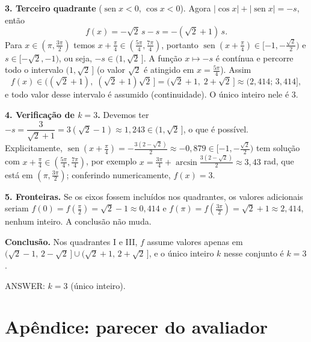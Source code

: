 \documentclass{article}%
\begin{document}
\textbf{3. Terceiro quadrante} ($\operatorname{sen}x<0$, $\cos x<0$). Agora $|\cos x|+|\operatorname{sen} x| = -s$, então
\[
f(x)=-\sqrt2\,s-s=-(\sqrt2+1)\,s .
\]
Para $x\in(\pi,\tfrac{3\pi}{2})$ temos $x+\tfrac{\pi}{4}\in(\tfrac{5\pi}{4},\tfrac{7\pi}{4})$, portanto $\operatorname{sen}(x+\tfrac{\pi}{4})\in[-1,-\tfrac{\sqrt2}{2})$ e $s\in[-\sqrt2,-1)$, ou seja, $-s\in(1,\sqrt2\,]$. A função $x\mapsto -s$ é contínua e percorre todo o intervalo $(1,\sqrt2\,]$ (o valor $\sqrt2$ é atingido em $x=\tfrac{5\pi}{4}$). Assim
\[
f(x)\in\big((\sqrt2+1),\;(\sqrt2+1)\sqrt2\,\big]=\big(\sqrt2+1,\;2+\sqrt2\,\big]\approx(2{,}414;\,3{,}414],
\]
e todo valor desse intervalo é assumido (continuidade). O único inteiro nele é $3$.

\textbf{4. Verificação de $k=3$.} Devemos ter $-s=\dfrac{3}{\sqrt2+1}=3(\sqrt2-1)\approx1{,}243\in(1,\sqrt2\,]$, o que é possível. Explicitamente, $\operatorname{sen}(x+\tfrac{\pi}{4})=-\tfrac{3(2-\sqrt2)}{2}\approx-0{,}879\in[-1,-\tfrac{\sqrt2}{2})$ tem solução com $x+\tfrac{\pi}{4}\in(\tfrac{5\pi}{4},\tfrac{7\pi}{4})$, por exemplo $x=\tfrac{3\pi}{4}+\arcsin\tfrac{3(2-\sqrt2)}{2}\approx3{,}43$ rad, que está em $(\pi,\tfrac{3\pi}{2})$; conferindo numericamente, $f(x)=3$.

\textbf{5. Fronteiras.} Se os eixos fossem incluídos nos quadrantes, os valores adicionais seriam $f(0)=f(\tfrac{\pi}{2})=\sqrt2-1\approx0{,}414$ e $f(\pi)=f(\tfrac{3\pi}{2})=\sqrt2+1\approx2{,}414$, nenhum inteiro. A conclusão não muda.

\textbf{Conclusão.} Nos quadrantes I e III, $f$ assume valores apenas em $(\sqrt2-1,\,2-\sqrt2\,]\cup(\sqrt2+1,\,2+\sqrt2\,]$, e o único inteiro $k$ nesse conjunto é $k=3$.

ANSWER: $k=3$ (único inteiro).%
\newpage%
\section*{Apêndice: parecer do avaliador}%
\end{document}
